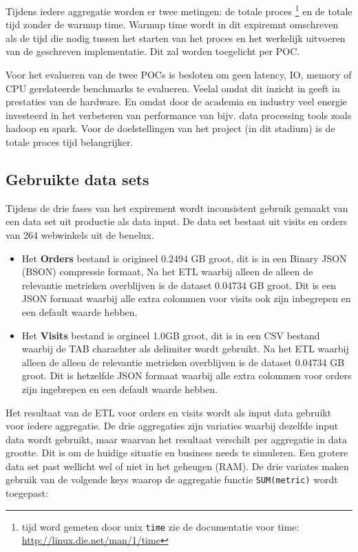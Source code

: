 Tijdens iedere aggregatie worden er twee metingen: de totale proces \footnote{tijd word gemeten door unix \verb#time# zie de documentatie voor time: \url{http://linux.die.net/man/1/time}} en de totale tijd zonder de warmup time.  Warmup time wordt in dit expiremnt omschreven als de tijd die nodig tussen het starten van het proces en het werkelijk uitvoeren van de geschreven implementatie. Dit zal worden toegelicht per POC.

Voor het evalueren van de twee POCs is besloten om geen latency, IO, memory of CPU gerelateerde benchmarks te evalueren. Veelal omdat dit inzicht in geeft in prestaties van de hardware. En omdat door de  academia en industry veel energie investeerd in het verbeteren van performance van bijv. data processing tools zoals hadoop en spark. Voor de doelstellingen van het project (in dit stadium) is de totale proces tijd belangrijker.

\subsection{Gebruikte data sets}

Tijdens de drie fases van het expirement wordt inconsistent gebruik gemaakt van een data set uit productie als data input. De data set bestaat uit visits en orders van 264 webwinkels uit de benelux.

\begin{itemize}
    \item Het \textbf{Orders} bestand is origineel 0.2494 GB groot, dit is in een Binary JSON (BSON) compressie formaat, Na het ETL waarbij alleen de alleen de relevantie metrieken overblijven is de dataset 0.04734 GB groot. Dit is een JSON formaat waarbij alle extra colommen voor visits ook zijn inbegrepen en een default waarde hebben.

    \item Het \textbf{Visits} bestand is orgineel 1.0GB groot, dit is in een CSV bestand waarbij de TAB charachter als delimiter wordt gebruikt.  Na het ETL waarbij alleen de alleen de relevantie metrieken overblijven is de dataset 0.04734 GB groot. Dit is hetzelfde JSON formaat waarbij alle extra colommen voor orders zijn ingebrepen en een default waarde hebben.
\end{itemize}

Het resultaat van de ETL voor orders en visits wordt als input data gebruikt voor iedere aggregatie. De drie aggregaties zijn variaties waarbij dezelfde input data wordt gebruikt, maar waarvan het resultaat verschilt per aggregatie in data grootte. Dit is om de huidige situatie en business needs te simuleren. Een grotere data set past wellicht wel of niet in het geheugen (RAM). De drie variates maken gebruik van de volgende keys waarop de aggregatie functie \verb#SUM(metric)# wordt toegepast:

